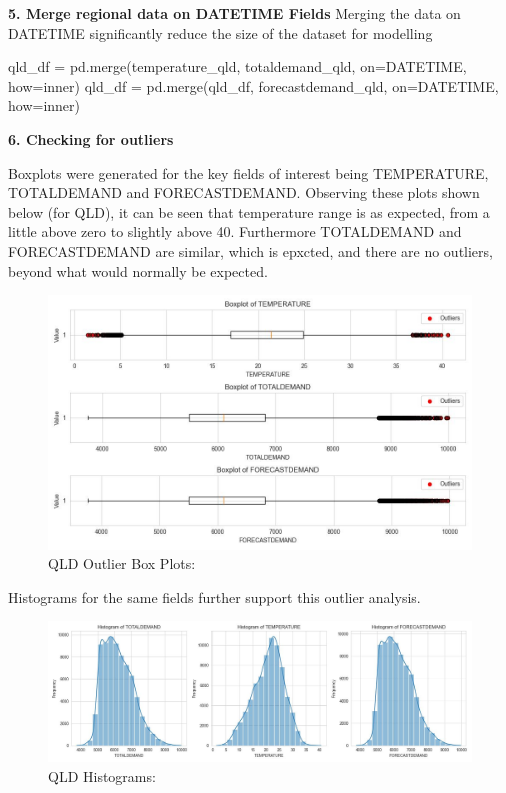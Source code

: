 \documentclass[mstat,12pt]{unswthesis}
\newenvironment{Shaded}{}{}
\newcommand{\NormalTok}[1]{#1}
\newcommand{\OperatorTok}[1]{\textcolor[rgb]{0.40,0.40,0.40}{#1}}
\newcommand{\StringTok}[1]{\textcolor[rgb]{0.25,0.44,0.63}{#1}}
\begin{document}
\textbf{5. Merge regional data on DATETIME Fields} Merging the data on
DATETIME significantly reduce the size of the dataset for modelling

\begin{Shaded}
\begin{Highlighting}[]
\NormalTok{qld\_df }\OperatorTok{=}\NormalTok{ pd.merge(temperature\_qld, totaldemand\_qld, on}\OperatorTok{=}\StringTok{\textquotesingle{}DATETIME\textquotesingle{}}\NormalTok{, how}\OperatorTok{=}\StringTok{\textquotesingle{}inner\textquotesingle{}}\NormalTok{)}
\NormalTok{qld\_df }\OperatorTok{=}\NormalTok{ pd.merge(qld\_df, forecastdemand\_qld, on}\OperatorTok{=}\StringTok{\textquotesingle{}DATETIME\textquotesingle{}}\NormalTok{, how}\OperatorTok{=}\StringTok{\textquotesingle{}inner\textquotesingle{}}\NormalTok{)}
\end{Highlighting}
\end{Shaded}

\textbf{6. Checking for outliers}

Boxplots were generated for the key fields of interest being
TEMPERATURE, TOTALDEMAND and FORECASTDEMAND. Observing these plots shown
below (for QLD), it can be seen that temperature range is as expected,
from a little above zero to slightly above 40. Furthermore TOTALDEMAND
and FORECASTDEMAND are similar, which is epxcted, and there are no
outliers, beyond what would normally be expected.

\begin{figure}
\centering
\includegraphics{img/OutlierBoxPlots.jpg}
\caption{QLD Outlier Box Plots:}
\end{figure}

Histograms for the same fields further support this outlier analysis.

\begin{figure}
\centering
\includegraphics{img/Histogram.jpg}
\caption{QLD Histograms:}
\end{figure}
\end{document}
